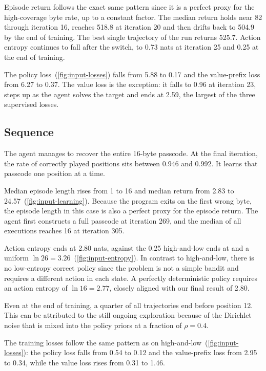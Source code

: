 Episode return follows the exact same pattern since it is a perfect proxy for
the high-coverage byte rate, up to a constant factor.
The median return holds near \num{82} through iteration 16, reaches \num{518.8} at iteration 20
and then drifts back to \num{504.9} by the end of training.
The best single trajectory of the run returns \num{525.7}.
Action entropy continues to fall after the switch, to \num{0.73} nats at iteration 25 and
\num{0.25} at the end of training.

The policy loss~(\cref{fig:input-losses}) falls from \num{5.88} to \num{0.17}
and the value-prefix loss from \num{6.27} to \num{0.37}.
The value loss is the exception: it falls to \num{0.96} at iteration 23, steps up as the agent
solves the target and ends at \num{2.59}, the largest of the three supervised losses.

\subsection{Sequence}\label{sec:results-sequence}

The agent manages to recover the entire 16-byte passcode.
At the final iteration, the rate of correctly played positions sits between \num{0.946} and \num{0.992}.
It learns that passcode one position at a time.

Median episode length rises from 1 to 16 and median return from \num{2.83} to
\num{24.57}~(\cref{fig:input-learning}).
Because the program exits on the first wrong byte, the episode length in this case
is also a perfect proxy for the episode return.
The agent first constructs a full passcode at iteration 269, and the median of all executions reaches 16 at iteration 305.

Action entropy ends at \num{2.80} nats, against the \num{0.25} high-and-low ends at and a uniform
$\ln 26 = \num{3.26}$~(\cref{fig:input-entropy}).
In contrast to high-and-low, there is no low-entropy correct policy since the problem
is not a simple bandit and requires a different action in each state.
A perfectly deterministic policy requires an action entropy of $\ln 16 =
\num{2.77}$, closely aligned with our final result of \num{2.80}.

Even at the end of training, a quarter of all trajectories end before position 12.
This can be attributed to the still ongoing exploration because of the Dirichlet noise
that is mixed into the policy priors at a fraction of $\rho = \num{0.4}$.

The training losses follow the same pattern as on high-and-low~(\cref{fig:input-losses}): the
policy loss falls from \num{0.54} to \num{0.12} and the value-prefix loss from \num{2.95} to
\num{0.34}, while the value loss rises from \num{0.31} to \num{1.46}.


